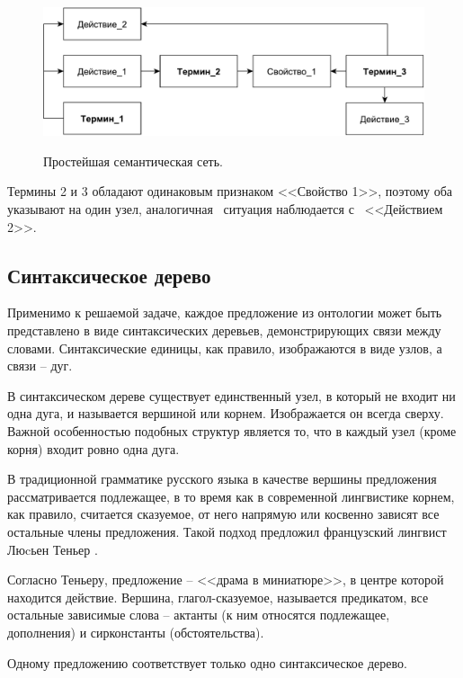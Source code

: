 \begin{figure}[h!]
	\begin{center}
		{\includegraphics[scale = 0.6]{img/net.pdf}}
		\caption{Простейшая семантическая сеть.}
		\label{fig4:image}
	\end{center}
\end{figure}

\newpage

Термины 2 и 3 обладают одинаковым признаком <<Свойство 1>>, поэтому оба указывают на один узел, аналогичная \, ситуация наблюдается с \, <<Действием 2>>. \\

\subsection{Синтаксическое дерево}
Применимо к решаемой задаче, каждое предложение из онтологии может быть представлено в виде синтаксических деревьев, демонстрирующих связи между словами. Синтаксические единицы, как правило, изображаются в виде узлов, а связи -- дуг.

В синтаксическом дереве существует единственный узел, в который не входит ни одна дуга, и называется вершиной или корнем. Изображается он всегда сверху. Важной особенностью подобных структур является то, что в каждый узел (кроме корня) входит ровно одна дуга. 

В традиционной грамматике русского языка в качестве вершины предложения рассматривается подлежащее, в то время как в современной лингвистике корнем, как правило, считается сказуемое, от него напрямую или косвенно зависят все остальные члены предложения. Такой подход предложил французский лингвист Люcьен Теньер \cite{syntree}.

Согласно Теньеру, предложение -- <<драма в миниатюре>>, в центре которой находится действие. Вершина, глагол-сказуемое, называется предикатом, все остальные зависимые слова -- актанты (к ним относятся подлежащее, дополнения) и сирконстанты (обстоятельства). 

Одному предложению соответствует только одно синтаксическое дерево.

